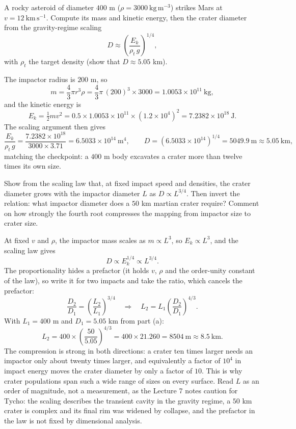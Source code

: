 \parti A rocky asteroid of diameter $400$ m ($\rho = 3000\ \mathrm{kg\,m^{-3}}$) strikes Mars at $v = 12\ \mathrm{km\,s^{-1}}$.
Compute its mass and kinetic energy,
then the crater diameter from the gravity-regime scaling
\[
D \approx \left(\frac{E_k}{\rho_t\,g}\right)^{1/4},
\]
with $\rho_t$ the target density (show that $D \approx 5.05$ km).

\begin{solution}
The impactor radius is $200$ m, so
\[
m = \frac{4}{3}\pi r^3 \rho = \frac{4}{3}\pi\,(200)^3 \times 3000 = 1.0053 \times 10^{11}\ \mathrm{kg},
\]
and the kinetic energy is
\[
E_k = \tfrac{1}{2} m v^2 = 0.5 \times 1.0053 \times 10^{11} \times (1.2 \times 10^{4})^2 = 7.2382 \times 10^{18}\ \mathrm{J}.
\]
The scaling argument then gives
\[
\frac{E_k}{\rho_t\,g} = \frac{7.2382 \times 10^{18}}{3000 \times 3.71} = 6.5033 \times 10^{14}\ \mathrm{m^4},
\qquad
D = \left(6.5033 \times 10^{14}\right)^{1/4} = 5049.9\ \mathrm{m} \approx 5.05\ \mathrm{km},
\]
matching the checkpoint: a $400$ m body excavates a crater more than twelve times its own size.
\end{solution}

\parti Show from the scaling law that, at fixed impact speed and densities, the crater diameter grows with the impactor diameter $L$ as $D \propto L^{3/4}$.
Then invert the relation: what impactor diameter does a $50$ km martian crater require?
Comment on how strongly the fourth root compresses the mapping from impactor size to crater size.

\begin{solution}
At fixed $v$ and $\rho$, the impactor mass scales as $m \propto L^3$, so $E_k \propto L^3$, and the scaling law gives
\[
D \propto E_k^{1/4} \propto L^{3/4}.
\]
The proportionality hides a prefactor (it holds $v$, $\rho$ and the order-unity constant of the law),
so write it for two impacts and take the ratio, which cancels the prefactor:
\[
\frac{D_2}{D_1} = \left(\frac{L_2}{L_1}\right)^{3/4}
\quad\Longrightarrow\quad
L_2 = L_1 \left(\frac{D_2}{D_1}\right)^{4/3}.
\]
With $L_1 = 400$ m and $D_1 = 5.05$ km from part (a):
\[
L_2 = 400 \times \left(\frac{50}{5.05}\right)^{4/3} = 400 \times 21.260 = 8504\ \mathrm{m} \approx 8.5\ \mathrm{km}.
\]
The compression is strong in both directions: a crater ten times larger needs an impactor only about twenty times larger,
and equivalently a factor of $10^4$ in impact energy moves the crater diameter by only a factor of $10$.
This is why crater populations span such a wide range of sizes on every surface.
Read $L$ as an order of magnitude, not a measurement, as the Lecture 7 notes caution for Tycho: the scaling describes the transient cavity in the gravity regime, a $50$ km crater is complex and its final rim was widened by collapse, and the prefactor in the law is not fixed by dimensional analysis.
\end{solution}

